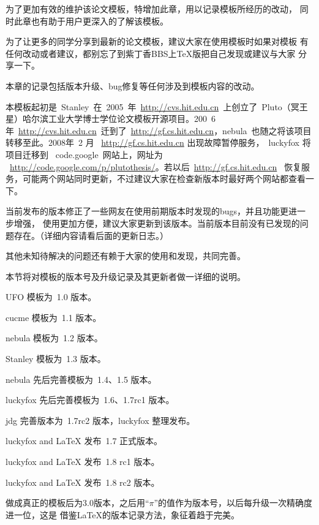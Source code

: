 

\label{Updatelog}

\label{Update:intro}
为了更加有效的维护该论文模板，特增加此章，用以记录模板所经历的改动，
同时此章也有助于用户更深入的了解该模板。

为了让更多的同学分享到最新的论文模板，建议大家在使用模板时如果对模板
有任何改动或者建议，都别忘了到紫丁香BBS上TeX版把自己发现或建议与大家
分享一下。

本章的记录包括版本升级、bug修复等任何涉及到模板内容的改动。

本模板起初是~Stanley~在~2005~年~\url{http://cvs.hit.edu.cn}~上创立了~Pluto（冥王星）哈尔滨工业大学博士学位论文模板开源项目。200~6年~\url{http://cvs.hit.edu.cn}~迁到了~\url{http://gf.cs.hit.edu.cn}，nebula~也随之将该项目转移至此。2008年~2 月  ~\url{http://gf.cs.hit.edu.cn} 出现故障暂停服务，~luckyfox 将项目迁移到~ code.google~网站上，网址为 ~\url{http://code.google.com/p/plutothesis/}。若以后~\url{http://gf.cs.hit.edu.cn}~ 恢复服务，可能两个网站同时更新，不过建议大家在检查新版本时最好两个网站都查看一下。


当前发布的版本修正了一些网友在使用前期版本时发现的bugs，并且功能更进一步增强，
使用更加方便，建议大家更新到该版本。当前版本目前没有已发现的问题存在。（详细内容请看后面的更新日志。）

其他未知待解决的问题还有赖于大家的使用和发现，共同完善。

本节将对模板的版本号及升级记录及其更新者做一详细的说明。

\begin{hitlist}
\item UFO 模板为~1.0 版本。
\item cucme 模板为~1.1 版本。
\item nebula 模板为~1.2 版本。
\item Stanley 模板为~1.3 版本。
\item nebula 先后完善模板为~1.4、1.5 版本。
\item luckyfox 先后完善模板为~1.6、1.7rc1 版本。
\item jdg 完善版本为~1.7rc2 版本，luckyfox 整理发布。
\item luckyfox and LaTeX 发布~1.7 正式版本。
\item luckyfox and LaTeX 发布~1.8 rc1 版本。
\item luckyfox and LaTeX 发布~1.8 rc2 版本。
\item 做成真正的模板后为3.0版本，之后用``$\pi$''的值作为版本号，以后每升级一次精确度进一位，这是
借鉴\LaTeX{}的版本记录方法，象征着趋于完美。
\end{hitlist}

